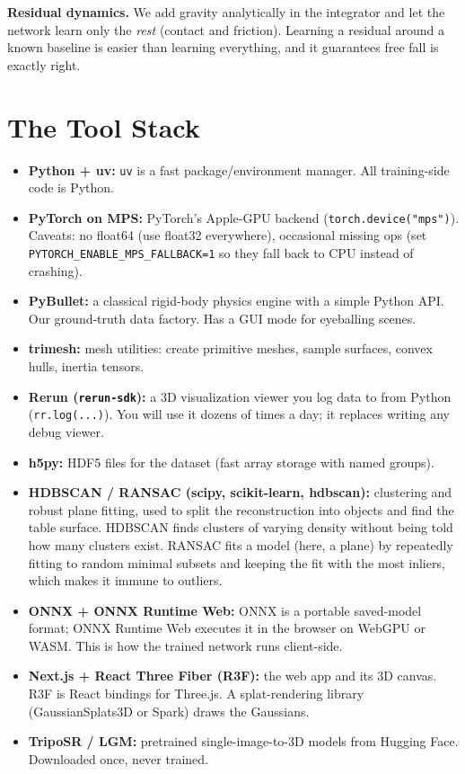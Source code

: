 \documentclass[11pt]{article}
\begin{document}
\textbf{Residual dynamics.} We add gravity analytically in the integrator and let the network learn only the \emph{rest} (contact and friction). Learning a residual around a known baseline is easier than learning everything, and it guarantees free fall is exactly right.

\section{The Tool Stack}

\begin{itemize}[itemsep=3pt]
  \item \textbf{Python + uv:} \texttt{uv} is a fast package/environment manager. All training-side code is Python.
  \item \textbf{PyTorch on MPS:} PyTorch's Apple-GPU backend (\texttt{torch.device("mps")}). Caveats: no float64 (use float32 everywhere), occasional missing ops (set \texttt{PYTORCH\_ENABLE\_MPS\_FALLBACK=1} so they fall back to CPU instead of crashing).
  \item \textbf{PyBullet:} a classical rigid-body physics engine with a simple Python API. Our ground-truth data factory. Has a GUI mode for eyeballing scenes.
  \item \textbf{trimesh:} mesh utilities: create primitive meshes, sample surfaces, convex hulls, inertia tensors.
  \item \textbf{Rerun (\texttt{rerun-sdk}):} a 3D visualization viewer you log data to from Python (\texttt{rr.log(...)}). You will use it dozens of times a day; it replaces writing any debug viewer.
  \item \textbf{h5py:} HDF5 files for the dataset (fast array storage with named groups).
  \item \textbf{HDBSCAN / RANSAC (scipy, scikit-learn, hdbscan):} clustering and robust plane fitting, used to split the reconstruction into objects and find the table surface. HDBSCAN finds clusters of varying density without being told how many clusters exist. RANSAC fits a model (here, a plane) by repeatedly fitting to random minimal subsets and keeping the fit with the most inliers, which makes it immune to outliers.
  \item \textbf{ONNX + ONNX Runtime Web:} ONNX is a portable saved-model format; ONNX Runtime Web executes it in the browser on WebGPU or WASM. This is how the trained network runs client-side.
  \item \textbf{Next.js + React Three Fiber (R3F):} the web app and its 3D canvas. R3F is React bindings for Three.js. A splat-rendering library (GaussianSplats3D or Spark) draws the Gaussians.
  \item \textbf{TripoSR / LGM:} pretrained single-image-to-3D models from Hugging Face. Downloaded once, never trained.
\end{itemize}
\end{document}

